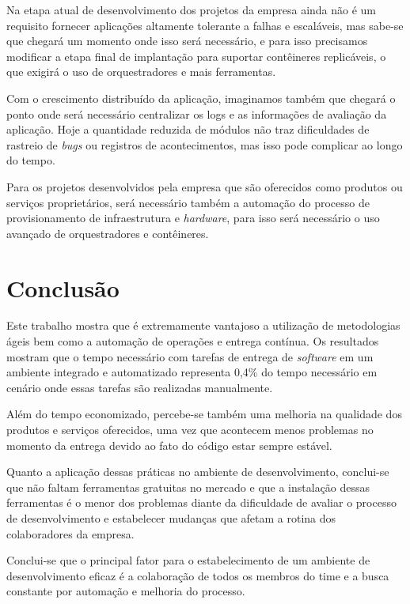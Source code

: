 \documentclass[
	12pt,				%
	openright,			%
	oneside,			%
	a4paper,			%
	english,			%
	french,				%
	spanish,			%
	brazil,				%
	]{abntex2}
\begin{document}
Na etapa atual de desenvolvimento dos projetos da empresa ainda não é um requisito fornecer aplicações altamente tolerante a falhas e escaláveis, mas sabe-se que chegará um momento onde isso será necessário, e para isso precisamos modificar a etapa final de implantação para suportar contêineres replicáveis, o que exigirá o uso de orquestradores e mais ferramentas.

Com o crescimento distribuído da aplicação, imaginamos também que chegará o ponto onde será necessário centralizar os logs e as informações de avaliação da aplicação. Hoje a quantidade reduzida de módulos não traz dificuldades de rastreio de \textit{bugs} ou registros de acontecimentos, mas isso pode complicar ao longo do tempo.

Para os projetos desenvolvidos pela empresa que são oferecidos como produtos ou serviços proprietários, será necessário também a automação do processo de provisionamento de infraestrutura e \textit{hardware}, para isso será necessário o uso avançado de orquestradores e contêineres.


\chapter{Conclusão}

Este trabalho mostra que é extremamente vantajoso a utilização de metodologias ágeis bem como a automação de operações e entrega contínua. Os resultados mostram que o tempo necessário com tarefas de entrega de \textit{software} em um ambiente integrado e automatizado representa 0,4\% do tempo necessário em cenário onde essas tarefas são realizadas manualmente.

Além do tempo economizado, percebe-se também uma melhoria na qualidade dos produtos e serviços oferecidos, uma vez que acontecem menos problemas no momento da entrega devido ao fato do código estar sempre estável.

Quanto a aplicação dessas práticas no ambiente de desenvolvimento, conclui-se que não faltam ferramentas gratuitas no mercado e que a instalação dessas ferramentas é o menor dos problemas diante da dificuldade de avaliar o processo de desenvolvimento e estabelecer mudanças que afetam a rotina dos colaboradores da empresa.

Conclui-se que o principal fator para o estabelecimento de um ambiente de desenvolvimento eficaz é a colaboração de todos os membros do time e a busca constante por automação e melhoria do processo.
\end{document}
